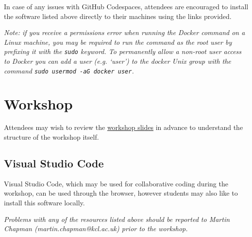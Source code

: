\documentclass{article}
\begin{document}
In case of any issues with GitHub Codespaces, attendees are encouraged to install the software listed above directly to their machines using the links provided. 

\emph{Note: if you receive a permissions error when running the Docker command on a Linux machine, you may be required to run the command as the root user by prefixing it with the \texttt{sudo} keyword. 
To permanently allow a non-root user access to Docker you can add a user (e.g. `user') to the docker Unix group with the command \texttt{sudo usermod -aG docker user}.}

\section{Workshop}

Attendees may wish to review the \href{https://github.com/martinteaching/sustainability/blob/master/workshops/kcl/2025/workshop-slides.md}{workshop slides} in advance to understand the structure of the workshop itself.

\subsection{Visual Studio Code}

Visual Studio Code, which may be used for collaborative coding during the workshop, can be used through the browser, however students may also like to install this software locally.

\emph{Problems with any of the resources listed above should be reported to Martin Chapman (martin.chapman@kcl.ac.uk) prior to the workshop.}
\end{document}

